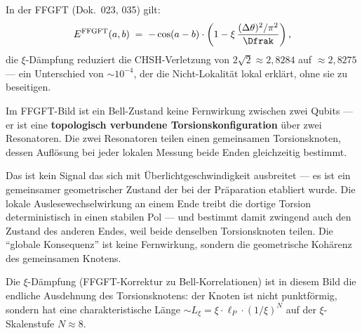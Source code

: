 In der FFGFT (Dok.~023, 035) gilt:
\begin{equation}
  E^{\text{FFGFT}}(a, b) \;=\;
  -\cos(a - b) \cdot
  \left(1 - \xi\,\frac{(\Delta\theta)^2/\pi^2}{\Dfrak}\right),
\end{equation}
die $\xi$-Dämpfung reduziert die CHSH-Verletzung von
$2\sqrt{2} \approx 2{,}8284$ auf
$\approx 2{,}8275$ --- ein Unterschied von
$\sim 10^{-4}$, der die Nicht-Lokalität lokal
erklärt, ohne sie zu beseitigen.

\begin{foundation}
Im FFGFT-Bild ist ein Bell-Zustand keine
Fernwirkung zwischen zwei Qubits ---
er ist eine \textbf{topologisch verbundene
Torsionskonfiguration} über zwei Resonatoren.
Die zwei Resonatoren teilen einen gemeinsamen
Torsionsknoten, dessen Auflösung
bei jeder lokalen Messung beide Enden
gleichzeitig bestimmt.

Das ist kein Signal das sich mit Überlichtgeschwindigkeit
ausbreitet --- es ist ein gemeinsamer geometrischer
Zustand der bei der Präparation etabliert wurde.
Die lokale Auslesewechselwirkung an einem Ende
treibt die dortige Torsion deterministisch in einen
stabilen Pol --- und bestimmt damit zwingend auch
den Zustand des anderen Endes, weil beide denselben
Torsionsknoten teilen.
Die ``globale Konsequenz'' ist keine Fernwirkung,
sondern die geometrische Kohärenz des gemeinsamen Knotens.

Die $\xi$-Dämpfung (FFGFT-Korrektur zu Bell-Korrelationen)
ist in diesem Bild die endliche Ausdehnung des
Torsionsknotens: der Knoten ist nicht punktförmig,
sondern hat eine charakteristische Länge
$\sim L_\xi = \xi \cdot \ell_P \cdot (1/\xi)^N$
auf der $\xi$-Skalenstufe $N \approx 8$.
\end{foundation}

